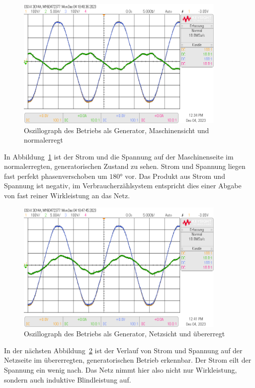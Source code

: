 \documentclass{report}
\begin{document}
\begin{figure}[!ht]
	\centering
	\includegraphics[width=0.9\textwidth]{./assets/img/synchronisation_maschine_generator_ne_vzp.png}
	\caption{Oszillograph des Betriebs als Generator, Maschinensicht und normalerregt}
	\label{fig:smgn}
\end{figure}

In Abbildung~\ref{fig:smgn} ist der Strom und die Spannung auf der Maschinenseite im normalerregten, generatorischen Zustand zu sehen. Strom und Spannung liegen fast perfekt phasenverschoben um $180°$ vor. Das Produkt aus Strom und Spannung ist negativ, im Verbraucherzählsystem entspricht dies einer Abgabe von fast reiner Wirkleistung an das Netz.

\begin{figure}[!ht]
	\centering
	\includegraphics[width=0.9\textwidth]{./assets/img/synchronisation_netz_generator_uee_vzp.png}
	\caption{Oszillograph des Betriebs als Generator, Netzsicht und übererregt}
	\label{fig:sngue}
\end{figure}

In der nächsten Abbildung~\ref{fig:sngue} ist der Verlauf von Strom und Spannung auf der Netzseite im übererregten, generatorischen Betrieb erkennbar. Der Strom eilt der Spannung ein wenig nach. Das Netz nimmt hier also nicht nur Wirkleistung, sondern auch induktive Blindleistung auf.
\end{document}
